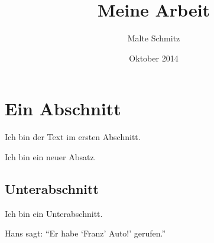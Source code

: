 \documentclass{scrartcl}
\author{Malte Schmitz}
\title{Meine Arbeit}
\date{Oktober 2014}
\begin{document}
  \maketitle

  \tableofcontents

  \section{Ein Abschnitt}

  Ich bin der Text im ersten Abschnitt.

  Ich bin ein neuer Absatz.

  \subsection{Unterabschnitt}

  Ich bin ein Unterabschnitt.

  Hans sagt: \enquote{Er habe \enquote{Franz' Auto!} gerufen.}
\end{document}
